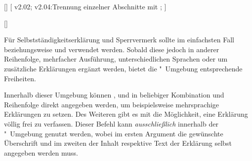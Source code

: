 \begin{DeclareEntity*}{}
\begin{DeclareEntity*}{}
\begin{DeclareEntity*}{}
\begin{Declaration}
  {[]}
[%
  v2.02;%
  v2.04:Trennung einzelner Abschnitte mit ;%
]
\begin{Declaration}
  {[]}
\begin{Declaration}
  {}
\begin{Declaration}
  {}
\begin{Declaration}
  {}
\begin{Declaration}
  {}
\begin{Declaration}
  {}
\begin{Declaration}
  {}
\begin{Declaration}
  {}
\begin{Declaration}
  {}
\begin{Declaration}
  {}
\printdeclarationlist

Für Selbstständigkeitserklärung und Sperrvermerk sollte im einfachsten Fall 
 beziehungsweise  und  
verwendet werden. Sobald diese jedoch in anderer Reihenfolge, mehrfacher 
Ausführung, unterschiedlichen Sprachen oder um zusätzliche Erklärungen ergänzt 
werden, bietet die "~Umgebung entsprechende 
Freiheiten.

Innerhalb dieser Umgebung können ,  und 
 in beliebiger Kombination und Reihenfolge direkt angegeben 
werden, um beispielsweise mehrsprachige Erklärungen zu setzen.
%
Des Weiteren gibt es mit  die 
Möglichkeit, eine Erklärung völlig frei zu verfassen. Dieser Befehl kann 
\emph{ausschließlich} innerhalb der "~Umgebung 
genutzt werden, wobei im ersten Argument die gewünschte Überschrift und im 
zweiten der Inhalt respektive Text der Erklärung selbst angegeben werden muss.


\end{Declaration}
\end{Declaration}
\end{Declaration}
\end{Declaration}
\end{Declaration}
\end{Declaration}
\end{Declaration}
\end{Declaration}
\end{Declaration}
\end{Declaration}
\end{Declaration}
\end{DeclareEntity*}
\end{DeclareEntity*}
\end{DeclareEntity*}
